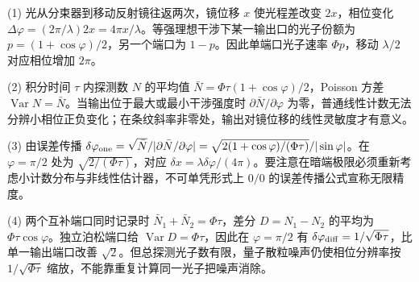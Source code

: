 (1) 光从分束器到移动反射镜往返两次，镜位移 \(x\) 使光程差改变 \(2x\)，相位变化 \(\Delta\varphi=(2\pi/\lambda)2x=4\pi x/\lambda\)。等强理想干涉下某一输出口的光子份额为 \(p=(1+\cos\varphi)/2\)，另一个端口为 \(1-p\)。因此单端口光子速率 \(\Phi p\)，移动 \(\lambda/2\) 对应相位增加 \(2\pi\)。

(2) 积分时间 \(\tau\) 内探测数 \(N\) 的平均值 \(\bar N=\Phi\tau(1+\cos\varphi)/2\)，Poisson 方差 \(\operatorname{Var}N=\bar N\)。当输出位于最大或最小干涉强度时 \(\partial\bar N/\partial\varphi\) 为零，普通线性计数无法分辨小相位正负变化；在条纹斜率非零处，输出对镜位移的线性灵敏度才有意义。

(3) 由误差传播 \(\delta\varphi_{\rm one}=\sqrt{\bar N}/|\partial\bar N/\partial\varphi|=\sqrt{2(1+\cos\varphi)/(\Phi\tau)}/|\sin\varphi|\)。在 \(\varphi=\pi/2\) 处为 \(\sqrt{2/(\Phi\tau)}\)，对应 \(\delta x=\lambda\delta\varphi/(4\pi)\)。要注意在暗端极限必须重新考虑小计数分布与非线性估计器，不可单凭形式上 \(0/0\) 的误差传播公式宣称无限精度。

(4) 两个互补端口同时记录时 \(\bar N_1+\bar N_2=\Phi\tau\)，差分 \(D=N_1-N_2\) 的平均为 \(\Phi\tau\cos\varphi\)。独立泊松端口给 \(\operatorname{Var}D=\Phi\tau\)，因此在 \(\varphi=\pi/2\) 有 \(\delta\varphi_{\rm diff}=1/\sqrt{\Phi\tau}\)，比单一输出端口改善 \(\sqrt2\)。但总探测光子数有限，量子散粒噪声仍使相位分辨率按 \(1/\sqrt{\Phi\tau}\) 缩放，不能靠重复计算同一光子把噪声消除。
